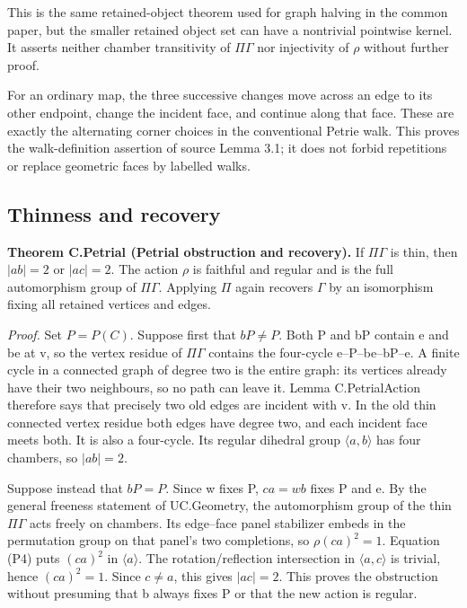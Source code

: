 This is the same retained-object theorem used for graph halving in the common paper,
but the smaller retained object set can have a nontrivial pointwise
kernel. It asserts neither chamber transitivity of \(\Pi \Gamma\) nor
injectivity of \(\rho\) without further proof.

For an ordinary map, the three successive changes move across an edge to
its other endpoint, change the incident face, and continue along that
face. These are exactly the alternating corner choices in the
conventional Petrie walk. This proves the walk-definition assertion of
source Lemma 3.1; it does not forbid repetitions or replace geometric
faces by labelled walks.

\subsection{Thinness and recovery}\label{thinness-and-recovery}

\textbf{Theorem C.Petrial (Petrial obstruction and recovery).} If
\(\Pi \Gamma\) is thin, then \(|ab|=2\) or \(|ac|=2\). The action
\(\rho\) is faithful and regular and is the full automorphism group of
\(\Pi \Gamma\). Applying \(\Pi\) again recovers \(\Gamma\) by an
isomorphism fixing all retained vertices and edges.

\emph{Proof.} Set \(P=P(C)\). Suppose first that \(bP\ne P\). Both P and
bP contain e and be at v, so the vertex residue of \(\Pi \Gamma\)
contains the four-cycle e--P--be--bP--e. A finite cycle in a connected
graph of degree two is the entire graph: its vertices already have their
two neighbours, so no path can leave it. Lemma C.PetrialAction therefore
says that precisely two old edges are incident with v. In the old thin
connected vertex residue both edges have degree two, and each incident
face meets both. It is also a four-cycle. Its regular dihedral group
\(\langle a,b\rangle\) has four chambers, so \(|ab|=2\).

Suppose instead that \(bP=P\). Since w fixes P, \(ca=wb\) fixes P and e.
By the general freeness statement of UC.Geometry, the automorphism group
of the thin \(\Pi \Gamma\) acts freely on chambers. Its edge--face panel
stabilizer embeds in the permutation group on that panel's two
completions, so \(\rho (ca)^2=1\). Equation (P4) puts \((ca)^2\) in
\(\langle a\rangle\). The rotation/reflection intersection in
\(\langle a,c\rangle\) is trivial, hence \((ca)^2=1\). Since \(c\ne a\),
this gives \(|ac|=2\). This proves the obstruction without presuming
that b always fixes P or that the new action is regular.

